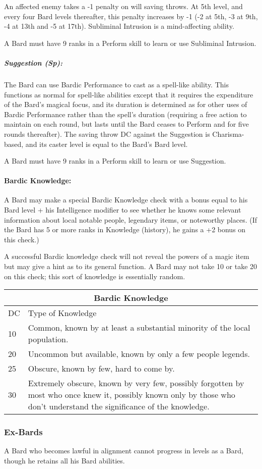 An affected enemy takes a -1 penalty on will saving throws. At 5th level, and every four Bard levels thereafter, this penalty increases by -1 (-2 at 5th, -3 at 9th, -4 at 13th and -5 at 17th). Subliminal Intrusion is a mind-affecting ability.

A Bard must have 9 ranks in a Perform skill to learn or use Subliminal Intrusion.
\subparagraph{Suggestion (Sp):}
The Bard can use Bardic Performance to cast  as a spell-like ability. 
This functions as normal for spell-like abilities except that it requires the expenditure of the Bard's magical focus, and its duration is determined as for other uses of Bardic Performance rather than the spell's duration (requiring a free action to maintain on each round, but lasts until the Bard ceases to Perform and for five rounds thereafter).
The saving throw DC against the Suggestion is Charisma-based, and its caster level is equal to the Bard's Bard level.

A Bard must have 9 ranks in a Perform skill to learn or use Suggestion.
\paragraph{Bardic Knowledge:}
A Bard may make a special Bardic Knowledge check with a bonus equal to his Bard level + his Intelligence modifier 
to see whether he knows some relevant information about local notable people, 
legendary items, or noteworthy places. (If the Bard has 5 or more ranks in Knowledge (history), he gains a +2 bonus on this check.)

A successful Bardic knowledge check will not reveal the powers of a magic item but may give a hint as to its general function. 
A Bard may not take 10 or take 20 on this check; this sort of knowledge is essentially random.
\begin{center}
\begin{tabular}{|p{0.4cm}|p{6cm}|}
\multicolumn{2}{c}{\textbf{Bardic Knowledge}}\\
\hline
DC &Type of Knowledge\\
\hline
10 &Common, known by at least a substantial minority of the local population.\\
20 &Uncommon but available, known by only a few people legends.\\
25 &Obscure, known by few, hard to come by.\\
30 &Extremely obscure, known by very few, possibly forgotten by most who once knew it, possibly known only by those who don't understand the significance of the knowledge.\\
\hline
\end{tabular}
\end{center}
\subsubsection{Ex-Bards}
A Bard who becomes lawful in alignment cannot progress in levels as a Bard, though he retains all his Bard abilities.